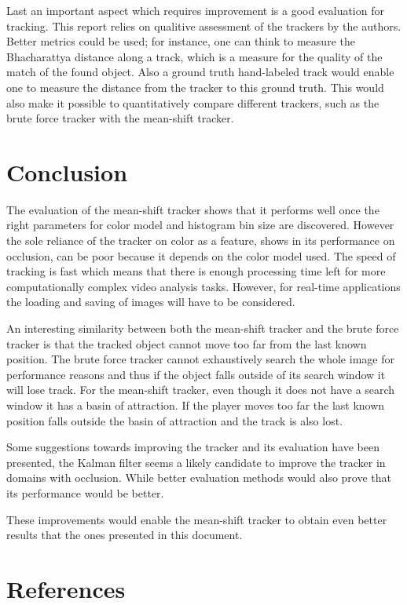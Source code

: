 \documentclass[a4paper,11pt]{article}
\begin{document}
Last an important aspect which requires improvement is a good evaluation for tracking. This report relies on qualitive assessment of the trackers by the authors. Better metrics could be used; for instance, one can think to measure the Bhacharattya distance along a track, which is a measure for the quality of the match of the found object. Also a ground truth hand-labeled track would enable one to measure the distance from the tracker to this ground truth. This would also make it possible to quantitatively compare different trackers, such as the brute force tracker with the mean-shift tracker.


\section{Conclusion} \label{sec:conc}
The evaluation of the mean-shift tracker shows that it performs well once the right parameters for color model and histogram bin size are discovered. However the sole reliance of the tracker on color as a feature, shows in its performance on occlusion, can be poor because it depends on the color model used. The speed of tracking is fast which means that there is enough processing time left for more computationally complex video analysis tasks. However, for real-time applications the loading and saving of images will have to be considered. 

An interesting similarity between both the mean-shift tracker and the brute force tracker is that the tracked object cannot move too far from the last known position. The brute force tracker cannot exhaustively search the whole image for performance reasons and thus if the object falls outside of its search window it will lose track. For the mean-shift tracker, even though it does not have a search window it has a basin of attraction. If the player moves too far the last known position falls outside the basin of attraction and the track is also lost.

Some suggestions towards improving the tracker and its evaluation have been presented, the Kalman filter seems a likely candidate to improve the tracker in domains with occlusion. While better evaluation methods would also prove that its performance would be better.
 
These improvements would enable the mean-shift tracker to obtain even better results that the ones presented in this document. 
\section{References} 


\renewcommand\bibname{References}


\end{document}
